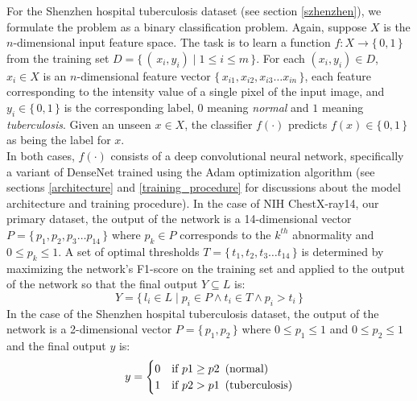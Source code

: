 \documentclass[12pt,twoside,a4paper]{report}
\begin{document}
For the Shenzhen hospital tuberculosis dataset (see section \ref{szhenzhen}), we
formulate the problem as a binary classification problem. Again, suppose $X$ is
the $n$-dimensional input feature space. The task is to learn a function $f:X
\rightarrow \{\,0, 1 \,\}$ from the training set $D = \{\,(\,x_i, y_i) \mid 1
\leq i \leq m\,\}$. For each $(x_i, y_i) \in D$, $x_i \in X$ is an
$n$-dimensional feature vector $\{\,x_{i1}, x_{i2}, x_{i3} \dots x_{in}\,\}$,
each feature corresponding to the intensity value of a single pixel of the input
image, and $y_i \in \{\,0, 1\,\}$ is the corresponding label, $0$ meaning
\emph{normal} and $1$ meaning \emph{tuberculosis}. Given an unseen $x \in X$,
the classifier
$f(\cdot)$ predicts $f(x) \in \{\,0, 1\,\}$ as being the label for $x$.\\

In both cases, $f(\cdot)$ consists of a deep convolutional neural
network\cite{lecun1998gradient}, specifically a variant of
DenseNet\cite{iandola2014densenet} trained using the Adam\cite{kingma2014adam}
optimization algorithm (see sections \ref{architecture} and
\ref{training_procedure} for discussions about the model architecture and
training procedure). In the case of NIH ChestX-ray14, our primary dataset, the
output of the network is a 14-dimensional vector $P = \{\,p_1, p_2, p_3 \dots
p_{14}\,\}$ where $p_k \in P$ corresponds to the $k^{th}$ abnormality and $0
\leq p_k \leq 1$. A set of optimal thresholds $T = \{\,t_1, t_2, t_3 \dots
t_{14}\,\}$ is determined by maximizing the network's F1-score on the training
set and applied to the output of the network so that the final output $Y
\subseteq L$ is:
\begin{equation}
  Y = \{\,l_i \in L \mid p_i \in P \wedge t_i \in T \wedge p_i > t_i \,\}
\end{equation}
In the case of the Shenzhen hospital tuberculosis dataset, the output of the
network is a 2-dimensional vector $P = \{\,p_1, p_2\,\}$ where $0 \leq p_1 \leq
1$ and $0 \leq p_2 \leq 1$ and the final output $y$ is:
\begin{equation}
  y = 
  \begin{cases}
    0 & \text{if $p1 \geq p2$\, (normal)}\\
    1 & \text{if $p2 > p1$\, (tuberculosis)}
  \end{cases}
\end{equation}
\end{document}
